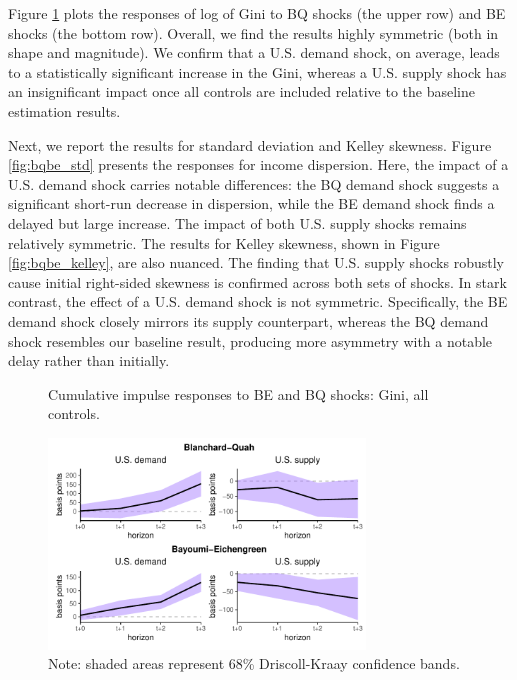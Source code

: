 \documentclass[12pt, a4paper]{article}
\begin{document}
Figure \ref{fig:bqbe_gini} plots the responses of log of Gini to BQ shocks (the upper row) and BE shocks (the bottom row). Overall, we find the results highly symmetric (both in shape and magnitude). We confirm that a U.S. demand shock, on average, leads to a statistically significant increase in the Gini, whereas a U.S. supply shock has an insignificant impact once all controls are included relative to the baseline estimation results.

Next, we report the results for standard deviation and Kelley skewness. Figure \ref{fig:bqbe_std} presents the responses for income dispersion. Here, the impact of a U.S. demand shock carries notable differences: the BQ demand shock suggests a significant short-run decrease in dispersion, while the BE demand shock finds a delayed but large increase. The impact of both U.S. supply shocks remains relatively symmetric. The results for Kelley skewness, shown in Figure \ref{fig:bqbe_kelley}, are also nuanced. The finding that U.S. supply shocks robustly cause initial right-sided skewness is confirmed across both sets of shocks. In stark contrast, the effect of a U.S. demand shock is not symmetric. Specifically, the BE demand shock closely mirrors its supply counterpart, whereas the BQ demand shock resembles our baseline result, producing more asymmetry with a notable delay rather than initially. 

\begin{figure}[H]
    \centering    
    \caption{Cumulative impulse responses to BE and BQ shocks: Gini, all controls.}  
    \label{fig:bqbe_gini}
    \includegraphics[width=0.75\textwidth]{Figures/robust_BQBE_demand_supply_LP.pdf}
    \centering \caption*{Note: shaded areas represent 68\% Driscoll-Kraay confidence bands.}
\end{figure}
\end{document}
